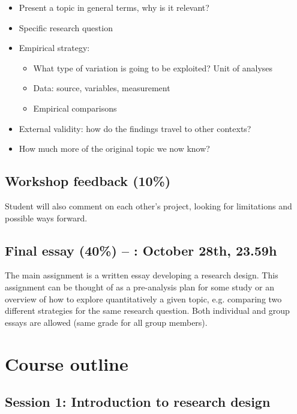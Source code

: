 \documentclass[12pt, a4paper]{article}
\begin{document}
\begin{itemize}
\setlength\itemsep{-5pt}
  \item Present a topic in general terms, why is it relevant?
  \item Specific research question
  \item Empirical strategy:
  \vspace{-10pt}
  \begin{itemize}
  \setlength\itemsep{-5pt}
    \item What type of variation is going to be exploited? Unit of analyses
    \item Data: source, variables, measurement
    \item Empirical comparisons
  \end{itemize}
  \item External validity: how do the findings travel to other contexts?
  \item How much more of the original topic we now know?
\end{itemize}

\subsection*{Workshop feedback (10\%)}

Student will also comment on each other's project, looking for limitations and possible ways forward.

\subsection*{Final essay (40\%) -- {\color{red}{deadline}}: October 28th, 23.59h}

The main assignment is a written essay developing a research design. This assignment can be thought of as a pre-analysis plan for some study or an overview of how to explore quantitatively a given topic, e.g. comparing two different strategies for the same research question. Both individual and group essays are allowed (same grade for all group members).

\newpage
\section{Course outline}

\subsection*{Session 1: Introduction to research design}
\end{document}
